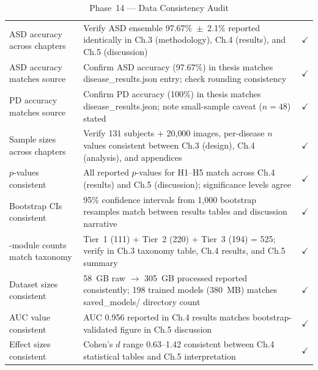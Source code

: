 \begingroup\singlespacing\tablefontsize\tablestripes
\begin{xltabular}{\textwidth}{@{} p{3.2cm} X c @{}}
\caption{Phase~14 --- Data Consistency Audit}
\label{tab:phase14_consistency}\\
\toprule
{} &  &  \\
\midrule
\endfirsthead
\endhead
\bottomrule
\endlastfoot
ASD accuracy across chapters           & Verify ASD ensemble 97.67\%~$\pm$~2.1\% reported identically in Ch.3 (methodology), Ch.4 (results), and Ch.5 (discussion)                   & $\checkmark$ \\
\addlinespace
ASD accuracy matches source             & Confirm ASD accuracy (97.67\%) in thesis matches disease\_results.json entry; check rounding consistency                              & $\checkmark$ \\
\addlinespace
PD accuracy matches source              & Confirm PD accuracy (100\%) in thesis matches disease\_results.json; note small-sample caveat ($n = 48$) stated                      & $\checkmark$ \\
\addlinespace
Sample sizes across chapters            & Verify 131 subjects + 20{,}000 images, per-disease $n$ values consistent between Ch.3 (design), Ch.4 (analysis), and appendices                      & $\checkmark$ \\
\addlinespace
$p$-values consistent                   & All reported $p$-values for H1--H5 match across Ch.4 (results) and Ch.5 (discussion); significance levels agree                     & $\checkmark$ \\
\addlinespace
Bootstrap CIs consistent                & 95\% confidence intervals from 1,000 bootstrap resamples match between results tables and discussion narrative                       & $\checkmark$ \\
-module counts match taxonomy        & Tier~1 (111) + Tier~2 (220) + Tier~3 (194) = 525; verify in Ch.3 taxonomy table, Ch.4 results, and Ch.5 summary                    & $\checkmark$ \\
\addlinespace
Dataset sizes consistent                & 58~GB raw $\rightarrow$ 305~GB processed reported consistently; 198 trained models (380~MB) matches saved\_models/ directory count   & $\checkmark$ \\
\addlinespace
AUC value consistent                    & AUC 0.956 reported in Ch.4 results matches bootstrap-validated figure in Ch.5 discussion                                             & $\checkmark$ \\
\addlinespace
Effect sizes consistent                 & Cohen's $d$ range 0.63--1.42 consistent between Ch.4 statistical tables and Ch.5 interpretation                                     & $\checkmark$ \\
\end{xltabular}
\endgroup

